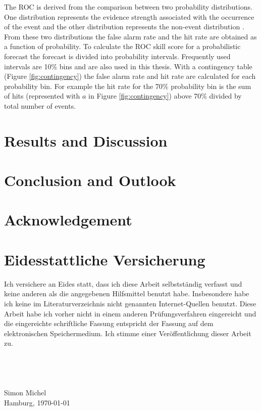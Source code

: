 \documentclass[11pt,twoside,a4paper,fleqn,x11names]{report}
\numberwithin{equation}{chapter}
\numberwithin{figure}{chapter}
\numberwithin{table}{chapter}
\begin{document}
The ROC is derived from the comparison between two probability distributions. One distribution represents the evidence strength associated with the occurrence of the event and the other distribution represents the non-event distribution \citep{Kharin2003}. From these two distributions the false alarm rate and the hit rate are obtained as a function of probability. To calculate the ROC skill score for a probabilistic forecast the forecast is divided into probability intervals. Frequently used intervals are 10\% bins and are also used in this thesis. With a contingency table (Figure \ref{fig:contingency}) the false alarm rate and hit rate are calculated for each probability bin. For example the hit rate for the 70\% probability bin is the sum of hits (represented with $a$ in Figure \ref{fig:contingency})  above 70\% divided by total number of events.


\chapter{Results and Discussion}

\chapter{Conclusion and Outlook}
\chapter{Acknowledgement}

\chapter{Eidesstattliche Versicherung}
Ich versichere an Eides statt, dass ich diese Arbeit selbstständig verfasst und keine anderen als die angegebenen Hilfsmittel benutzt habe. Insbesondere habe ich keine im Literaturverzeichnis nicht genannten Internet-Quellen benutzt. Diese Arbeit habe ich vorher nicht in einem anderen Prüfungsverfahren eingereicht und die eingereichte schriftliche Fassung entspricht der Fassung auf dem elektronischen Speichermedium. Ich stimme einer Veröffentlichung dieser Arbeit zu.
\\
\\
\\
\\
\\
Simon Michel\\
Hamburg, \today
\end{document}
